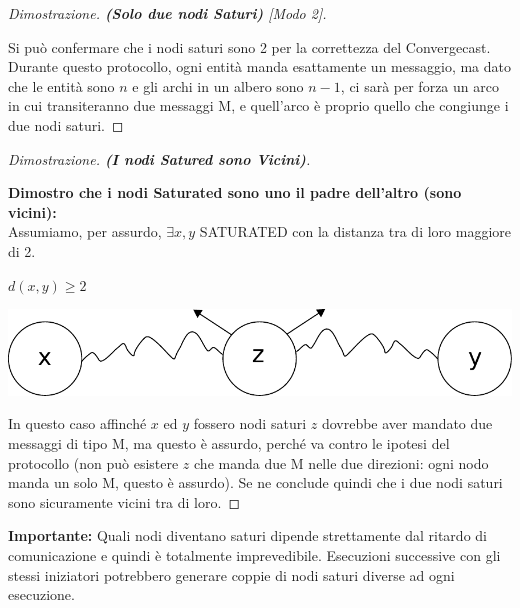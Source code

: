 \begin{proof}[Dimostrazione. \textbf{(Solo due nodi Saturi)} \textit{[Modo 2]}]\

    Si può confermare che i nodi
    saturi sono 2 per la correttezza del Convergecast. Durante questo
    protocollo, ogni entità manda esattamente un messaggio, ma dato che le
    entità sono $n$ e gli archi in un albero sono $n-1$, ci sarà per forza
    un arco in cui transiteranno due messaggi M, e quell'arco è proprio
    quello che congiunge i due nodi saturi.
\end{proof}
\begin{proof}[Dimostrazione. \textbf{(I nodi Satured sono Vicini)}]\

    \textbf{Dimostro che i nodi Saturated sono uno il padre dell'altro
        (sono vicini):}\\  Assumiamo, per assurdo, $\exists x,y$ SATURATED con la
    distanza tra di loro maggiore di 2.
    \begin{center}
        $d(x,y) \geq 2$

        \includegraphics[scale=0.5]{capitoli/saturazione/imgs/n_41}
    \end{center}

    In questo caso affinché $x$ ed $y$ fossero nodi saturi $z$ dovrebbe
    aver mandato due messaggi di tipo M, ma questo è assurdo, perché va
    contro le ipotesi del protocollo (non può esistere $z$ che manda due M
    nelle due direzioni: ogni nodo manda un solo M, questo è assurdo). Se
    ne conclude quindi che i due nodi saturi sono sicuramente vicini tra
    di loro.

\end{proof}

\textbf{Importante:} Quali nodi diventano saturi dipende strettamente dal
ritardo di comunicazione e quindi è totalmente imprevedibile. Esecuzioni
successive con gli stessi iniziatori potrebbero generare coppie di nodi saturi
diverse ad ogni esecuzione.

